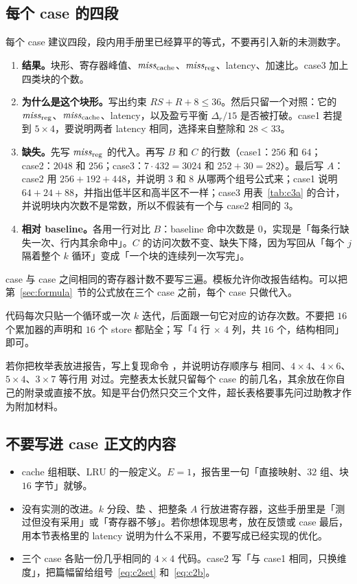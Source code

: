 \subsection{每个 case 的四段}

每个 case 建议四段，段内用手册里已经算平的等式，不要再引入新的未测数字。

\begin{enumerate}
  \item \textbf{结果。}块形、寄存器峰值、$\mathit{miss}_{\mathrm{cache}}$、$\mathit{miss}_{\mathrm{reg}}$、latency、加速比。case3 加上四类块的个数。
  \item \textbf{为什么是这个块形。}写出约束 $RS+R+8\le 36$。然后只留一个对照：它的 $\mathit{miss}_{\mathrm{reg}}$、$\mathit{miss}_{\mathrm{cache}}$、latency，以及盈亏平衡 $\Delta_r/15$ 是否被打破。case1 若提到 $5\times4$，要说明两者 latency 相同，选择来自整除和 $28<33$。
  \item \textbf{缺失。}先写 $\mathit{miss}_{\mathrm{reg}}$ 的代入。再写 $B$ 和 $C$ 的行数（case1：$256$ 和 $64$；case2：$2048$ 和 $256$；case3：$7\cdot432=3024$ 和 $252+30=282$）。最后写 $A$：case2 用 $256+192+448$，并说明 $3$ 和 $8$ 从哪两个组号公式来；case1 说明 $64+24+88$，并指出低半区和高半区不一样；case3 用表~\ref{tab:c3a} 的合计，并说明块内次数不是常数，所以不假装有一个与 case2 相同的 $3$。
  \item \textbf{相对 baseline。}各用一行对比 $B$：baseline 命中次数是 $0$，实现是「每条行缺失一次、行内其余命中」。$C$ 的访问次数不变、缺失下降，因为写回从「每个 $j$ 隔着整个 $k$ 循环」变成「一个块的连续列一次写完」。
\end{enumerate}

case 与 case 之间相同的寄存器计数不要写三遍。模板允许你改报告结构。可以把第~\ref{sec:formula}~节的公式放在三个 case 之前，每个 case 只做代入。

代码每次只贴一个循环或一次 $k$ 迭代，后面跟一句它对应的访存次数。不要把 $16$ 个累加器的声明和 $16$ 个 store 都贴全；写「$4$ 行 $\times$ $4$ 列，共 $16$ 个，结构相同」即可。

若你把枚举表放进报告，写上复现命令 ，并说明访存顺序与  相同、$4\times4$、$4\times6$、$5\times4$、$3\times7$ 等行用  对过。完整表太长就只留每个 case 的前几名，其余放在你自己的附录或直接不放。知是平台仍然只交三个文件，超长表格要事先问过助教才作为附加材料。

\subsection{不要写进 case 正文的内容}

\begin{itemize}
  \item cache 组相联、LRU 的一般定义。$E=1$，报告里一句「直接映射、$32$ 组、块 $16$ 字节」就够。
  \item 没有实测的改进。$k$ 分段、垫 、把整条 $A$ 行放进寄存器，这些手册里是「测过但没有采用」或「寄存器不够」。若你想体现思考，放在反馈或 case 最后，用本节表格里的 latency 说明为什么不采用，不要写成已经实现的优化。
  \item 三个 case 各贴一份几乎相同的 $4\times4$ 代码。case2 写「与 case1 相同，只换维度」，把篇幅留给组号~\eqref{eq:c2set} 和~\eqref{eq:c2b}。
\end{itemize}

